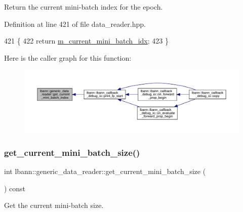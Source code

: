 Return the current mini-\/batch index for the epoch. 



Definition at line 421 of file data\+\_\+reader.\+hpp.


\begin{DoxyCode}
421                                            \{
422     \textcolor{keywordflow}{return} \hyperlink{classlbann_1_1generic__data__reader_aefd4bc0bf95de1e2500827581acf3536}{m\_current\_mini\_batch\_idx};
423   \}
\end{DoxyCode}
Here is the caller graph for this function\+:\nopagebreak
\begin{figure}[H]
\begin{center}
\leavevmode
\includegraphics[width=350pt]{classlbann_1_1generic__data__reader_a35521b27677081ee9ed30f25aeb3b508_icgraph}
\end{center}
\end{figure}
\mbox{\label{classlbann_1_1generic__data__reader_aec4624f295e1e3c6c5053838624441a5}} 
\subsubsection{\texorpdfstring{get\+\_\+current\+\_\+mini\+\_\+batch\+\_\+size()}{get\_current\_mini\_batch\_size()}}
{\footnotesize\ttfamily int lbann\+::generic\+\_\+data\+\_\+reader\+::get\+\_\+current\+\_\+mini\+\_\+batch\+\_\+size (\begin{DoxyParamCaption}{ }\end{DoxyParamCaption}) const}



Get the current mini-\/batch size. 



